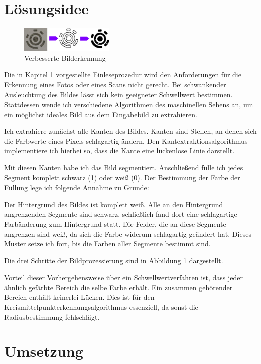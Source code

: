 \section{Lösungsidee}
\begin{figure}
		\setlength\intextsep{0pt}
		\centering	
		\includegraphics[width=0.4\textwidth]{Grafiken/sek3abb1}
		\caption{Verbesserte Bilderkennung}
		\label{abb:transform}
	\end{figure}
Die in Kapitel 1 vorgestellte Einleseprozedur wird den Anforderungen für die Erkennung eines Fotos oder eines Scans nicht gerecht. Bei schwankender Ausleuchtung des Bildes lässt sich kein geeigneter Schwellwert bestimmen. Stattdessen wende ich verschiedene Algorithmen des maschinellen Sehens an, um ein möglichst ideales Bild aus dem Eingabebild zu extrahieren.

Ich extrahiere zunächst alle Kanten des Bildes. Kanten sind Stellen, an denen sich die Farbwerte eines Pixels schlagartig ändern. Den Kantextraktionsalgorithmus implementiere ich hierbei so, dass die Kante eine lückenlose Linie darstellt.

Mit diesen Kanten habe ich das Bild segmentiert. Anschließend fülle ich jedes Segment komplett schwarz (1) oder weiß (0).
Der Bestimmung der Farbe der Füllung lege ich folgende Annahme zu Grunde:

Der Hintergrund des Bildes ist komplett weiß. Alle an den Hintergrund angrenzenden Segmente sind schwarz, schließlich fand dort eine schlagartige Farbänderung zum Hintergrund statt. Die Felder, die an diese Segmente angrenzen sind weiß, da sich die Farbe widerum schlagartig geändert hat. Dieses Muster setze ich fort, bis die Farben aller Segmente bestimmt sind.

Die drei Schritte der Bildprozessierung sind in Abbildung \ref{abb:transform} dargestellt.

Vorteil dieser Vorhergehensweise über ein Schwellwertverfahren ist, dass jeder ähnlich gefärbte Bereich die selbe Farbe erhält. Ein zusammen gehörender Bereich enthält keinerlei Lücken. Dies ist für den Kreismittelpunkterkennungsalgorithmus essenziell, da sonst die Radiusbestimmung fehlschlägt.
 
\section{Umsetzung}
